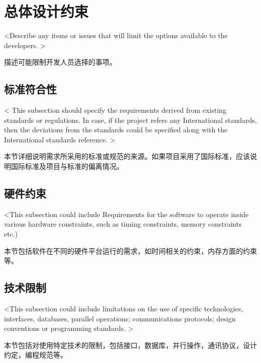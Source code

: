 \chapter{总体设计约束}
<Describe any items or issues that will limit the options available to the developers. >

描述可能限制开发人员选择的事项。
 
\section{标准符合性}
< This subsection should specify the requirements derived from existing standards or regulations. In case, if the project refers any International standards, then the deviations from the standards could be specified along with the International standards reference. >

本节详细说明需求所采用的标准或规范的来源。如果项目采用了国际标准，应该说明国际标准及项目与标准的偏离情况。

\section{硬件约束}
<This subsection could include Requirements for the software to operate inside various hardware constraints, such as timing constraints, memory constraints etc.)

本节包括软件在不同的硬件平台运行的需求，如时间相关的约束，内存方面的约束等。

\section{技术限制}
<This subsection could include limitations on the use of specific technologies, interfaces, databases, parallel operations; communications protocols; design conventions or programming standards. >

本节包括对使用特定技术的限制，包括接口，数据库，并行操作，通讯协议，设计约定，编程规范等。
